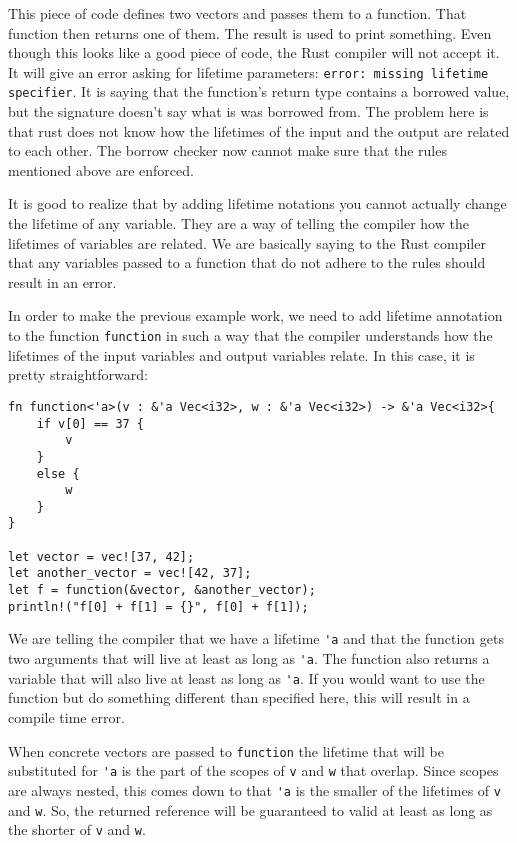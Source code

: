 This piece of code defines two vectors and passes them to a function. That function then returns one of them. The result is used to print something. Even though this looks like a good piece of code, the Rust compiler will not accept it. It will give an error asking for lifetime parameters: \texttt{error: missing lifetime specifier}. It is saying that the function's return type contains a borrowed value, but the signature doesn't say what is was borrowed from. The problem here is that rust does not know how the lifetimes of the input and the output are related to each other. The borrow checker now cannot make sure that the rules mentioned above are enforced. 

It is good to realize that by adding lifetime notations you cannot actually change the lifetime of any variable. They are a way of telling the compiler how the lifetimes of variables are related. We are basically saying to the Rust compiler that any variables passed to a function that do not adhere to the rules should result in an error. 

In order to make the previous example work, we need to add lifetime annotation to the function \verb|function| in such a way that the compiler understands how the lifetimes of the input variables and output variables relate. In this case, it is pretty straightforward: 

\begin{verbatim}
fn function<'a>(v : &'a Vec<i32>, w : &'a Vec<i32>) -> &'a Vec<i32>{
    if v[0] == 37 {
        v
    }
    else {
        w
    }
}

let vector = vec![37, 42];
let another_vector = vec![42, 37];
let f = function(&vector, &another_vector);
println!("f[0] + f[1] = {}", f[0] + f[1]);
\end{verbatim}

We are telling the compiler that we have a lifetime \verb|'a| and that the function gets two arguments that will live at least as long as \verb|'a|. The function also returns a variable that will also live at least as long as \verb|'a|. If you would want to use the function but do something different than specified here, this will result in a compile time error. 

When concrete vectors are passed to \verb|function| the lifetime that will be substituted for \verb|'a| is the part of the scopes of \verb|v| and \verb|w| that overlap. Since scopes are always nested, this comes down to that \verb|'a| is the smaller of the lifetimes of \verb|v| and \verb|w|. So, the returned reference will be guaranteed to valid at least as long as the shorter of \verb|v| and \verb|w|.


